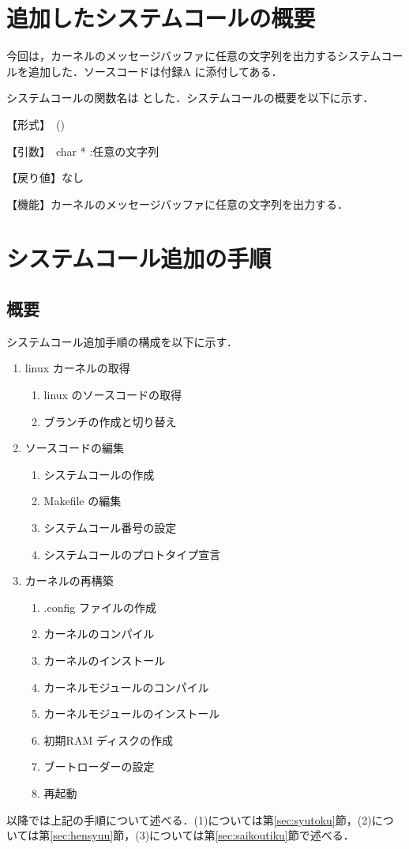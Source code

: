 \documentclass[12pt]{jsarticle}
\begin{document}
\section{追加したシステムコールの概要}\label{sec:gaiyou}
今回は，カーネルのメッセージバッファに任意の文字列を出力するシステムコールを追加した．ソースコードは付録A に添付してある．

システムコールの関数名は とした．システムコールの概要を以下に示す．

【形式】　()

【引数】　char * :任意の文字列

【戻り値】なし

【機能】カーネルのメッセージバッファに任意の文字列を出力する．

\section{システムコール追加の手順}\label{sec:tejun}
 \subsection{概要}
システムコール追加手順の構成を以下に示す．
\begin{enumerate}
\item linux カーネルの取得
  \begin{enumerate}
  \item linux のソースコードの取得
  \item ブランチの作成と切り替え
  \end{enumerate}
\item ソースコードの編集
  \begin{enumerate}
  \item システムコールの作成
  \item Makefile の編集
  \item システムコール番号の設定
  \item システムコールのプロトタイプ宣言
  \end{enumerate}
\item カーネルの再構築
  \begin{enumerate}
  \item .config ファイルの作成
  \item カーネルのコンパイル
  \item カーネルのインストール
  \item カーネルモジュールのコンパイル
  \item カーネルモジュールのインストール
  \item 初期RAM ディスクの作成
  \item ブートローダーの設定
  \item 再起動
  \end{enumerate}
\end{enumerate}
以降では上記の手順について述べる．(1)については第\ref{sec:syutoku}節，(2)については第\ref{sec:hensyuu}節，(3)については第\ref{sec:saikoutiku}節で述べる．
\end{document}
